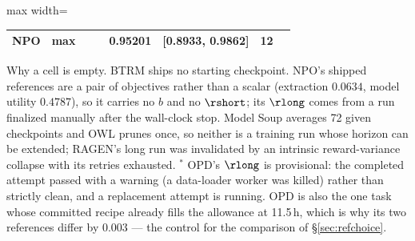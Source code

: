 \begin{table}[t]
\begin{adjustbox}{max width=\linewidth}
\begin{tabular}{llrrrlrl}
NPO        & max & \na{}    & \na{}    & 0.95201 & [0.8933, 0.9862] & 12 & \na{} \\
\bottomrule
\end{tabular}
\end{adjustbox}
\par\vspace{2pt}
{\footnotesize Why a cell is empty. BTRM ships no starting checkpoint. NPO's shipped references
are a pair of objectives rather than a scalar (extraction $0.0634$, model utility $0.4787$), so
it carries no $b$ and no $\rshort$; its $\rlong$ comes from a run finalized manually after the
wall-clock stop. Model Soup averages 72 given checkpoints and OWL prunes once, so neither is a
training run whose horizon can be extended; RAGEN's long run was invalidated by an intrinsic
reward-variance collapse with its retries exhausted. $^\ast$ OPD's $\rlong$ is provisional: the
completed attempt passed with a warning (a data-loader worker was killed) rather than strictly
clean, and a replacement attempt is running. OPD is also the one task whose committed recipe
already fills the allowance at 11.5\,h, which is why its two references differ by $0.003$ ---
the control for the comparison of \S\ref{sec:refchoice}.}
\end{table}
